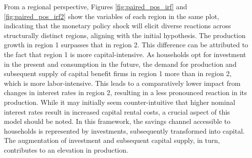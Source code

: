 \documentclass[../thesis.tex]{subfiles}
\begin{document}


From a regional perspective, Figures \eqref{fig:paired_pos_irf} and \eqref{fig:paired_pos_irf2} show the variables of each region in the same plot, indicating that the monetary policy shock will elicit diverse reactions across structurally distinct regions, aligning with the initial hypothesis. The production growth in region 1 surpasses that in region 2. This difference can be attributed to the fact that region 1 is more capital-intensive. As households opt for investment in the present and consumption in the future, the demand for production and subsequent supply of capital benefit firms in region 1 more than in region 2, which is more labor-intensive. This leads to a comparatively lower impact from changes in interest rates in region 2, resulting in a less pronounced reaction in its production. \textcolor{blue}{}While it may initially seem counter-intuitive that higher nominal interest rates result in increased capital rental costs, a crucial aspect of this model should be noted. In this framework, the savings channel accessible to households is represented by investments, subsequently transformed into capital. The augmentation of investment and subsequent capital supply, in turn, contributes to an elevation in production.
\end{document}
